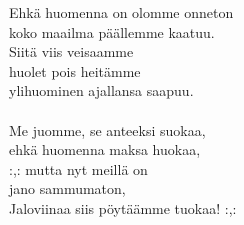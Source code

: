 
            Ehkä huomenna on olomme onneton \\
            koko maailma päällemme kaatuu. \\
            Siitä viis veisaamme \\
            huolet pois heitämme \\
            ylihuominen ajallansa saapuu. \\
\hspace{10mm} \\
            Me juomme, se anteeksi suokaa, \\
            ehkä huomenna maksa huokaa, \\
            :,: mutta nyt meillä on \\
            jano sammumaton, \\
            Jaloviinaa siis pöytäämme tuokaa! :,: \\
